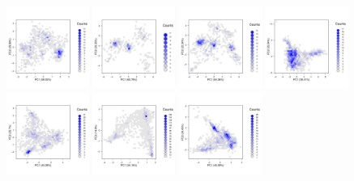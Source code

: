 \documentclass[12pt]{article}\usepackage[]{graphicx}\usepackage[]{color}
\begin{document}
\begin{figure}[p]
  \includegraphics[width = 0.24\textwidth]{./figure/fighexpca-6.pdf}
  \includegraphics[width = 0.24\textwidth]{./figure/fighexpca-7.pdf}
  \includegraphics[width = 0.24\textwidth]{./figure/fighexpca-8.pdf}
  \includegraphics[width = 0.24\textwidth]{./figure/fighexpca-9.pdf}
  \includegraphics[width = 0.24\textwidth]{./figure/fighexpca-10.pdf}
  \includegraphics[width = 0.24\textwidth]{./figure/fighexpca-11.pdf}
  \includegraphics[width = 0.24\textwidth]{./figure/fighexpca-12.pdf}

\end{figure}
\end{document}
